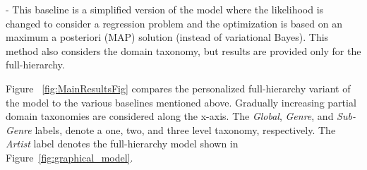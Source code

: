  - This baseline is a simplified version of the model where the likelihood is changed to consider a regression problem and the optimization is based on an maximum a posteriori (MAP) solution (instead of variational Bayes). This method also considers the domain taxonomy, but results are provided only for the full-hierarchy. 






Figure ~\ref{fig:MainResultsFig} compares the personalized full-hierarchy variant of the model  to the various baselines mentioned above. Gradually increasing partial domain taxonomies are considered along the x-axis. The \textit{Global}, \textit{Genre}, and \textit{Sub-Genre} labels, denote a one, two, and three level taxonomy, respectively. The \textit{Artist} label denotes the full-hierarchy model shown in Figure~\ref{fig:graphical_model}.

